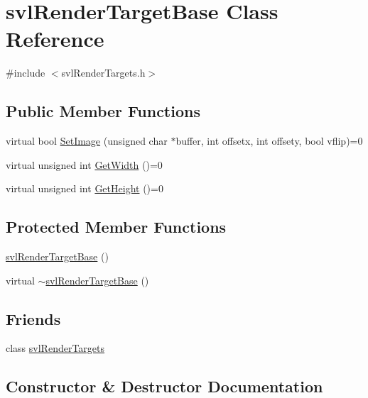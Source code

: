 \hypertarget{classsvl_render_target_base}{}\section{svl\+Render\+Target\+Base Class Reference}
\label{classsvl_render_target_base}


{\ttfamily \#include $<$svl\+Render\+Targets.\+h$>$}

\subsection*{Public Member Functions}
\begin{DoxyCompactItemize}
\item 
virtual bool \hyperlink{classsvl_render_target_base_ae65b2538bea48d50813515c7077d8c6a}{Set\+Image} (unsigned char $\ast$buffer, int offsetx, int offsety, bool vflip)=0
\item 
virtual unsigned int \hyperlink{classsvl_render_target_base_afad55b6bc36ee21e20556671860802d7}{Get\+Width} ()=0
\item 
virtual unsigned int \hyperlink{classsvl_render_target_base_a758a963eab79b5c3cfc22b301693c9b7}{Get\+Height} ()=0
\end{DoxyCompactItemize}
\subsection*{Protected Member Functions}
\begin{DoxyCompactItemize}
\item 
\hyperlink{classsvl_render_target_base_a9c73fd8b304e922b0110757d61c81a75}{svl\+Render\+Target\+Base} ()
\item 
virtual \hyperlink{classsvl_render_target_base_a18904f3f077b97a1a4ea0ffa81573218}{$\sim$svl\+Render\+Target\+Base} ()
\end{DoxyCompactItemize}
\subsection*{Friends}
\begin{DoxyCompactItemize}
\item 
class \hyperlink{classsvl_render_target_base_ad804de78e5a33b34b46d99e75bab0aed}{svl\+Render\+Targets}
\end{DoxyCompactItemize}


\subsection{Constructor \& Destructor Documentation}
\hypertarget{classsvl_render_target_base_a9c73fd8b304e922b0110757d61c81a75}{}

